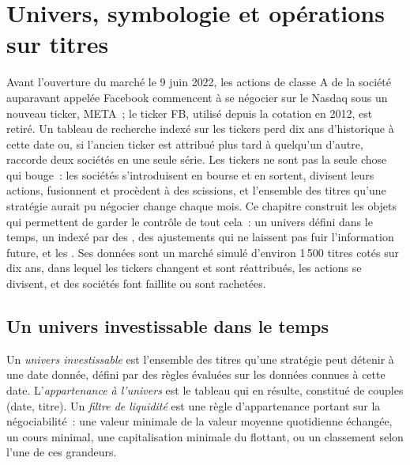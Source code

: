 \chapter{Univers, symbologie et opérations sur titres}\label{ch:rs:universe-symbology-and-corporate-actions}

Avant l'ouverture du marché le 9 juin 2022, les actions de classe A de la société auparavant appelée Facebook commencent à se négocier sur
le Nasdaq sous un nouveau ticker, META~; le ticker FB, utilisé depuis la cotation en 2012, est retiré. Un tableau de recherche
indexé sur les tickers perd dix ans d'historique à cette date ou, si l'ancien ticker est attribué plus tard à quelqu'un d'autre, raccorde deux
sociétés en une seule série. Les tickers ne sont pas la seule chose qui bouge~: les sociétés s'introduisent en bourse et en sortent, divisent leurs actions, fusionnent
et procèdent à des scissions, et l'ensemble des titres qu'une stratégie aurait pu négocier change chaque mois. Ce chapitre construit les objets qui
permettent de garder le contrôle de tout cela~: un univers défini dans le temps, un  indexé par des , des ajustements
qui ne laissent pas fuir l'information future, et les . Ses données sont un marché simulé d'environ 1\,500 titres cotés sur dix ans,
dans lequel les tickers changent et sont réattribués, les actions se divisent, et des sociétés font faillite ou sont rachetées.

\section{Un univers investissable dans le temps}

\begin{definition}\label{def:rs:universe-symbology-and-corporate-actions:universe}
Un \emph{univers investissable} est l'ensemble des titres qu'une stratégie peut détenir à une date donnée, défini par
des règles évaluées sur les données connues à cette date. L'\emph{appartenance à l'univers} est le tableau qui en résulte, constitué de
couples (date, titre). Un \emph{filtre de liquidité} est une règle d'appartenance portant sur la négociabilité~: une valeur minimale de la
valeur moyenne quotidienne échangée, un cours minimal, une capitalisation minimale du flottant, ou un classement selon l'une de ces grandeurs.
\end{definition}


